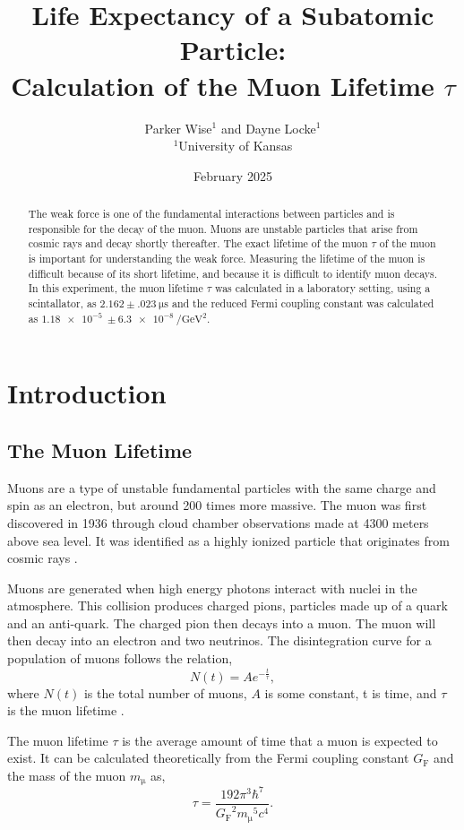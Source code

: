 \documentclass[%
 reprint,
 amsmath,amssymb,
 aps,
]{revtex4-2}
\begin{document}
\begin{abstract}
	  The weak force is one of the fundamental interactions between particles and is responsible for the decay of the muon. Muons are unstable particles that arise from cosmic rays and decay shortly thereafter. The exact lifetime of the muon $\tau$ of the muon is important for understanding the weak force. Measuring the lifetime of the muon is difficult because of its short lifetime, and because it is difficult to identify muon decays. In this experiment, the muon lifetime $\tau$ was calculated in a laboratory setting, using a scintallator, as $2.162\pm \SI{.023}{\micro\second}$ and the reduced Fermi coupling constant was calculated as $\SI{1.18e-5}{}\pm\SI{6.3e-8}{\per\giga\electronvolt\squared}$.

\end{abstract}


\title[title]{Life Expectancy of a Subatomic Particle:\\ Calculation of the Muon Lifetime $\tau$}

\author{Parker Wise$^{1}$ and Dayne Locke$^{1}$\\$^{1}$University of Kansas}
\date{February 2025}
\maketitle
\section{Introduction}
\subsection{The Muon Lifetime}
Muons are a type of unstable fundamental particles with the same charge and spin as an electron, but around 200 times more massive. The muon was first discovered in 1936 through cloud chamber observations made at 4300 meters above sea level. It was identified as a highly ionized particle that originates from cosmic rays \cite{anderson}.
\par
Muons are generated when high energy photons interact with nuclei in the atmosphere. This collision produces charged pions, particles made up of a quark and an anti-quark. The charged pion then decays into a muon. The muon will then decay into an electron and two neutrinos. The disintegration curve for a population of muons follows the relation,
\begin{equation}
	N(t) = Ae^{-\frac{t}{\tau}},
	\label{eq:dis-curve}
\end{equation}
where $N(t)$ is the total number of muons, $A$ is some constant, t is time, and $\tau$ is the muon lifetime \cite{rasetti}. 
\par
The muon lifetime $\tau$ is the average amount of time that a muon is expected to exist. It can be calculated theoretically from the Fermi coupling constant $G_\mathrm{F}$ and the mass of the muon $m_\mathrm{\mu}$ \cite{lifetime} as,
\begin{equation}
	\tau = \frac{192\pi^3\hbar^7}{{G_\mathrm{F}}^2 {m_\mathrm{\mu}}^5 c^4}.
	\label{theory-tau}
\end{equation}
\end{document}
